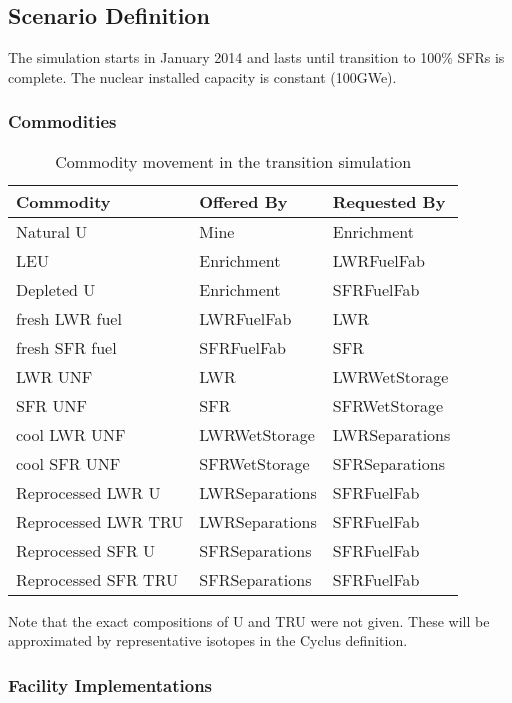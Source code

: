 \subsection{Scenario Definition}

The simulation starts in January 2014 and lasts until transition to 100\% SFRs 
is complete. The nuclear installed capacity is constant (100GWe).


\subsubsection{Commodities}

\begin{table}[h!]
\centering
\begin{tabular}{|l|l|l|}
\hline
Commodity  &     Offered By  &    Requested By \\
\hline
Natural  U & Mine & Enrichment \\ 
LEU & Enrichment & LWRFuelFab \\ 
Depleted  U & Enrichment & SFRFuelFab \\ 
fresh  LWR  fuel & LWRFuelFab & LWR \\ 
fresh  SFR  fuel & SFRFuelFab & SFR \\ 
LWR  UNF & LWR & LWRWetStorage \\ 
SFR  UNF & SFR & SFRWetStorage \\ 
cool LWR  UNF & LWRWetStorage & LWRSeparations \\ 
cool SFR  UNF & SFRWetStorage & SFRSeparations \\ 
Reprocessed  LWR  U & LWRSeparations & SFRFuelFab \\ 
Reprocessed  LWR  TRU & LWRSeparations & SFRFuelFab \\ 
Reprocessed  SFR  U & SFRSeparations & SFRFuelFab \\ 
Reprocessed  SFR  TRU & SFRSeparations & SFRFuelFab \\ 
\hline
\end{tabular}
\caption{Commodity movement in the transition simulation}
\label{tab:commods}
\end{table}

Note that the exact compositions of U and TRU were not given. These will be
approximated by representative isotopes in the Cyclus definition.


\subsubsection{Facility Implementations}

